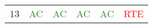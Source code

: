 \documentclass[thesis=M,english,hidelinks]{FITthesis}[2012/10/20]
\theoremstyle{definition}
\begin{document}
\begin{table}[ht]
\begin{tabular}{ m{1cm} | m{1.5cm} m{1.5cm} m{1.5cm} m{1.5cm} m{1.5cm} }
        13 & \textcolor{ForestGreen}{AC} & \textcolor{ForestGreen}{AC} & \textcolor{ForestGreen}{AC} & \textcolor{ForestGreen}{AC} & \textcolor{Red}{RTE} \\

\end{tabular}
\end{table}
\end{document}
